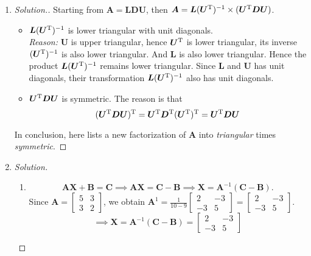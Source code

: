 \begin{enumerate}
\begin{proof}[Solution.]
\begin{enumerate}
\[
\bm{ABAB} = \begin{bmatrix}
1537&864\\1008&1393
\end{bmatrix}
\]
which is obviously \textit{not symmetric.}
\end{enumerate}
\end{proof}
\item
\begin{proof}[Solution.]
Starting from $\bm A = \bm{LDU}$, then $\bm A = \bm L(\bm U^{\mathrm T})^{-1}\times(\bm U^{\mathrm T}\bm D\bm U)$.
\begin{itemize}
\item
$\bm L(\bm U^{\mathrm T})^{-1}$ is lower triangular with unit diagonals. \\
\textit{Reason: }$\bm U$ is upper triangular, hence $\bm U^{\mathrm T}$ is lower triangular, its inverse $(\bm U^{\mathrm T})^{-1}$ is also lower triangular. And $\bm L$ is also lower triangular. Hence the product $\bm{L}(\bm U^{\mathrm T})^{-1}$ remains lower triangular. Since $\bm L$ and $\bm U$ has unit diagonals, their transformation $\bm{L}(\bm U^{\mathrm T})^{-1}$ also has unit diagonals.
\item
$\bm U^{\mathrm T}\bm D\bm U$ is symmetric. The reason is that
\[
(\bm U^{\mathrm T}\bm D\bm U)^{\mathrm T} = \bm U^{\mathrm T}\bm D^{\mathrm T} (\bm U^{\mathrm T})^{\mathrm T} = \bm U^{\mathrm T}\bm D\bm U
\]
\end{itemize}
In conclusion, here lists a new factorization of $\bm A$ into \textit{triangular} times \textit{symmetric}.
\end{proof}
\item
\begin{proof}[Solution]
\begin{enumerate}
\item
\[\bm{AX} + \bm B = \bm C\implies
\bm{AX} = \bm C- \bm B \implies
\bm{X} = \bm A^{-1}(\bm C- \bm B).\]
Since $\bm A = \begin{bmatrix}
5&3\\3&2
\end{bmatrix}$, we obtain $\bm A^{1} = \frac{1}{10-9}\begin{bmatrix}
2&-3\\-3&5
\end{bmatrix} = \begin{bmatrix}
2&-3\\-3&5
\end{bmatrix}$.\\
\[
\implies\bm X = \bm A^{-1}(\bm C- \bm B) =\begin{bmatrix}
2&-3\\-3&5

\end{bmatrix}\]
\end{enumerate}
\end{proof}
\end{enumerate}
